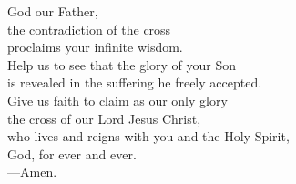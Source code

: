 \prayer


\begin{prayerverse}
God our Father,\\
the contradiction of the cross\\
proclaims your infinite wisdom.\\
Help us to see that the glory of your Son\\
is revealed in the suffering he freely accepted.\\
Give us faith to claim as our only glory\\
the cross of our Lord Jesus Christ,\\
who lives and reigns with you and the Holy Spirit,\\
God, for ever and ever.\\
{\color{red}---\thinspace}Amen.
\end{prayerverse}

